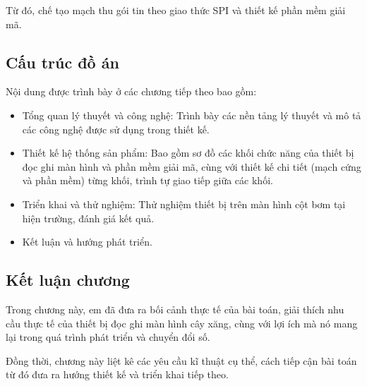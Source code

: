 Từ đó, chế tạo mạch thu gói tin theo giao thức SPI và thiết kế phần mềm giải mã.

\subsection{Cấu trúc đồ án}

Nội dung được trình bày ở các chương tiếp theo bao gồm: 
\begin{itemize}
   \item Tổng quan lý thuyết và công nghệ: Trình bày các nền tảng lý thuyết và mô tả các công nghệ được sử dụng trong thiết kế.
   \item Thiết kế hệ thống sản phẩm: Bao gồm sơ đồ các khối chức năng của thiết bị đọc ghi màn hình và phần mềm giải mã, cùng với thiết kế chi tiết (mạch cứng và phần mềm) từng khối, trình tự giao tiếp giữa các khối.
   \item Triển khai và thử nghiệm: Thử nghiệm thiết bị trên màn hình cột bơm tại hiện trường, đánh giá kết quả.
   \item Kết luận và hướng phát triển.
\end{itemize}

\subsection{Kết luận chương}

\hspace{1cm} Trong chương này, em đã đưa ra bối cảnh thực tế của bài toán, giải thích nhu cầu thực tế của thiết bị đọc ghi màn hình cây xăng, cùng với lợi ích mà nó mang lại trong quá trình phát triển và chuyển đổi số.

Đồng thời, chương này liệt kê các yêu cầu kĩ thuật cụ thể, cách tiếp cận bài toán từ đó đưa ra hướng thiết kế và triển khai tiếp theo.

